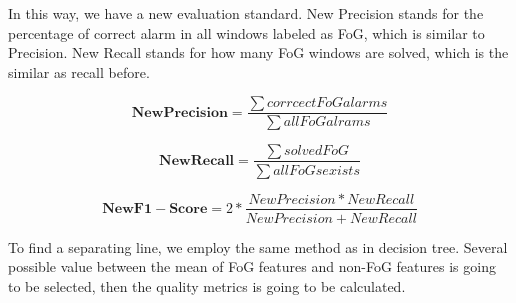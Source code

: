 \documentclass[article]{article}
\begin{document}
	In this way, we have a new evaluation standard. New Precision stands for the percentage of correct alarm in all windows labeled as FoG, which is similar to Precision. New Recall stands for how many FoG windows are solved, which is the similar as recall before.
	
	\begin{equation}
	\mathbf{New Precision} = \frac{\sum corrcect FoG alarms}{\sum all FoG alrams}
	\end{equation}
	
	\begin{equation}
	\mathbf{New Recall} = \frac{\sum solved FoG}{\sum all FoGs exists}
	\end{equation}
	
	\begin{equation}
	\mathbf{New F1-Score} = 2*\frac{NewPrecision * NewRecall}{NewPrecision+NewRecall}
	\end{equation}
	
	
	To find a separating line, we employ the same method as in decision tree. Several possible value between the mean of FoG features and non-FoG features is going to be selected, then the quality metrics is going to be calculated. 
	
\end{document}
